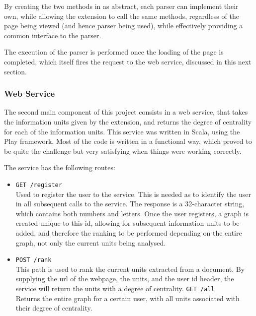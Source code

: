 By creating the two methods in  as abstract, each parser can implement their own, while allowing the extension to call the same methods, regardless of the page being viewed (and hence parser being used), while effectively providing a common interface to the parser. 

The execution of the parser is performed once the loading of the page is completed, which itself fires the request to the web service, discussed in this next section.

\subsubsection{Web Service}
The second main component of this project consists in a web service, that takes the information units given by the extension, and returns the degree of centrality for each of the information units. This service was written in Scala, using the Play framework. Most of the code is written in a functional way, which proved to be quite the challenge but very satisfying when things were working correctly. 

The service has the following routes:

\begin{itemize}
\item \texttt{GET /register}\\
Used to register the user to the service. This is needed as to identify the user in all subsequent calls to the service. The response is a 32-character string, which contains both numbers and letters. Once the user registers, a graph is created unique to this id, allowing for subsequent information units to be added, and therefore the ranking to be performed depending on the entire graph, not only the current units being analysed.
\item \texttt{POST /rank}\\
This path is used to rank the current units extracted from a document. By supplying the url of the webpage, the units, and the user id header, the service will return the units with a degree of centrality. 
\texttt{GET /all}\\
Returns the entire graph for a certain user, with all units associated with their degree of centrality.
\end{itemize}

